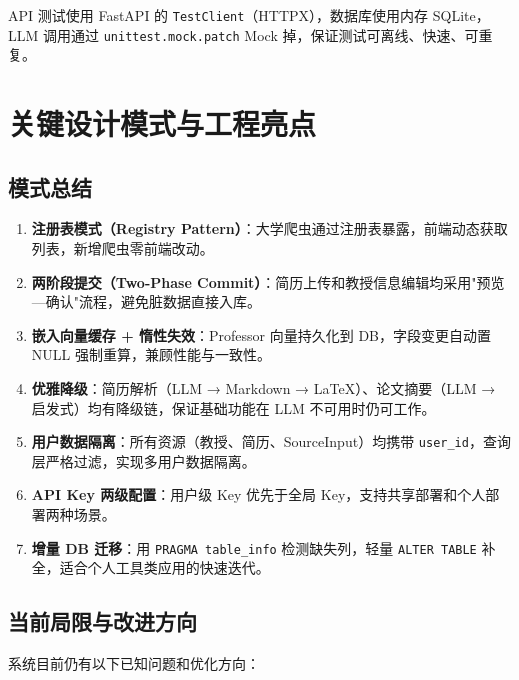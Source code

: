 \documentclass[11pt]{article}
\begin{document}
API 测试使用 FastAPI 的 \texttt{TestClient}（HTTPX），数据库使用内存 SQLite，LLM 调用通过 \texttt{unittest.mock.patch} Mock 掉，保证测试可离线、快速、可重复。

\section{关键设计模式与工程亮点}

\subsection{模式总结}

\begin{enumerate}
    \item \textbf{注册表模式（Registry Pattern）}：大学爬虫通过注册表暴露，前端动态获取列表，新增爬虫零前端改动。

    \item \textbf{两阶段提交（Two-Phase Commit）}：简历上传和教授信息编辑均采用"预览—确认"流程，避免脏数据直接入库。

    \item \textbf{嵌入向量缓存 + 惰性失效}：Professor 向量持久化到 DB，字段变更自动置 NULL 强制重算，兼顾性能与一致性。

    \item \textbf{优雅降级}：简历解析（LLM → Markdown → LaTeX）、论文摘要（LLM → 启发式）均有降级链，保证基础功能在 LLM 不可用时仍可工作。

    \item \textbf{用户数据隔离}：所有资源（教授、简历、SourceInput）均携带 \texttt{user\_id}，查询层严格过滤，实现多用户数据隔离。

    \item \textbf{API Key 两级配置}：用户级 Key 优先于全局 Key，支持共享部署和个人部署两种场景。

    \item \textbf{增量 DB 迁移}：用 \texttt{PRAGMA table\_info} 检测缺失列，轻量 \texttt{ALTER TABLE} 补全，适合个人工具类应用的快速迭代。
\end{enumerate}

\subsection{当前局限与改进方向}

系统目前仍有以下已知问题和优化方向：
\end{document}
